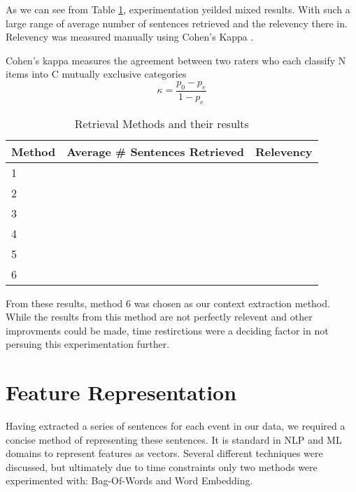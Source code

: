 \documentclass[bsc,frontabs,twoside,singlespacing,parskip,deptreport]{infthesis}     %
\begin{document}

As we can see from Table \ref{table:retrieval}, experimentation yeilded mixed results.
With such a large range of average number of sentences retrieved and the relevency there in.
Relevency was measured manually using Cohen's Kappa \cite{}.

Cohen's kappa measures the agreement between two raters who each classify N items into C mutually exclusive categories
\begin{equation}
  \kappa = \frac{p_{0} - p_{e}}{1 - p_{e}}
  \end{equation}

\begin{table}[h]
\centering
\caption{Retrieval Methods and their results}
\label{table:retrieval}
\begin{tabular}{|l|l|l|}
  \hline
Method & Average \# Sentences Retrieved & Relevency \\
\hline
1      &                                &           \\
2      &                                &           \\
3      &                                &           \\
4      &                                &           \\
5      &                                &           \\
6      &                                &           \\        
\hline
\end{tabular}
\end{table}

From these results, method 6 was chosen as our context extraction method. While the
results from this method are not perfectly relevent and other improvments could be made,
time restirctions were a deciding factor in not persuing this experimentation further.

\section{Feature Representation}
Having extracted a series of sentences for each event in our data, we required a concise method
of representing these sentences. It is standard in NLP and ML domains to represent features as vectors.
Several different techniques were discussed, but ultimately due to time constraints only two methods were
experimented with: Bag-Of-Words and Word Embedding.
\end{document}
